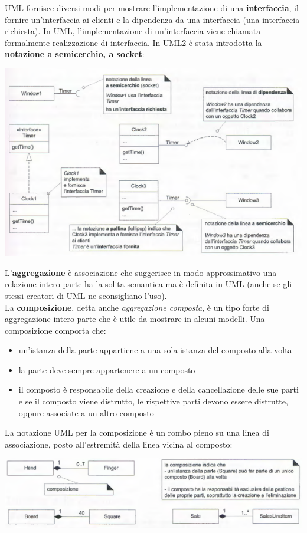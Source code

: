 \documentclass[a4paper,12pt, oneside]{book}
\begin{document}
UML fornisce diversi modi per mostrare l'implementazione di una \textbf{interfaccia}, il fornire un'interfaccia ai clienti e la dipendenza da una interfaccia (una interfaccia richiesta). In UML, l'implementazione di un'interfaccia viene chiamata formalmente realizzazione di interfaccia. In UML2 è stata introdotta la \textbf{notazione a semicerchio, a socket}:
\begin{center}
	\includegraphics[scale=0.7]{img/clasd14.png}
\end{center}
L'\textbf{aggregazione} è associazione che suggerisce in modo approssimativo una relazione intero-parte ha la solita semantica ma è definita in UML (anche se gli stessi creatori di UML ne sconsigliano l'uso).\\
La \textbf{composizione}, detta anche \textit{aggregazione composta}, è un tipo forte di aggregazione intero-parte che è utile da mostrare in alcuni modelli. Una composizione comporta che:
\begin{itemize}
	\item un'istanza della parte appartiene a una sola istanza del composto alla volta
	\item la parte deve sempre appartenere a un composto
	\item il composto è responsabile della creazione e della cancellazione delle sue parti e se il composto viene distrutto, le rispettive parti devono essere distrutte, oppure associate a un altro composto
\end{itemize}
La notazione UML per la composizione è un rombo pieno su una linea di associazione, posto all'estremità della linea vicina al composto:
\begin{center}
	\includegraphics[scale=0.7]{img/clasd15.png}
\end{center}
\end{document}

